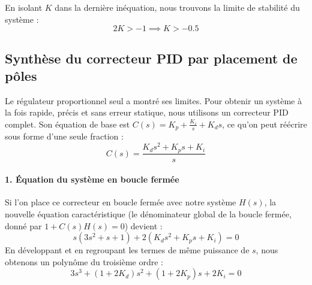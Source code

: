 \documentclass[11pt,a4paper]{article}
\begin{document}
En isolant $K$ dans la dernière inéquation, nous trouvons la limite de stabilité du système :
\begin{equation}
    2K > -1 \implies K > -0.5
\end{equation}

\subsection{Synthèse du correcteur PID par placement de pôles}

Le régulateur proportionnel seul a montré ses limites. Pour obtenir un système à la fois rapide, précis et sans erreur statique, nous utilisons un correcteur PID complet. Son équation de base est $C(s) = K_p + \frac{K_i}{s} + K_d s$, ce qu'on peut réécrire sous forme d'une seule fraction :
\begin{equation}
    C(s) = \frac{K_d s^2 + K_p s + K_i}{s}
\end{equation}

\paragraph{1. Équation du système en boucle fermée}
Si l'on place ce correcteur en boucle fermée avec notre système $H(s)$, la nouvelle équation caractéristique (le dénominateur global de la boucle fermée, donné par $1 + C(s)H(s) = 0$) devient :
\begin{equation}
    s(3s^2 + s + 1) + 2(K_d s^2 + K_p s + K_i) = 0
\end{equation}
En développant et en regroupant les termes de même puissance de $s$, nous obtenons un polynôme du troisième ordre :
\begin{equation}
    3s^3 + (1 + 2K_d)s^2 + (1 + 2K_p)s + 2K_i = 0
    \label{eq:pid_reel}
\end{equation}
\end{document}
